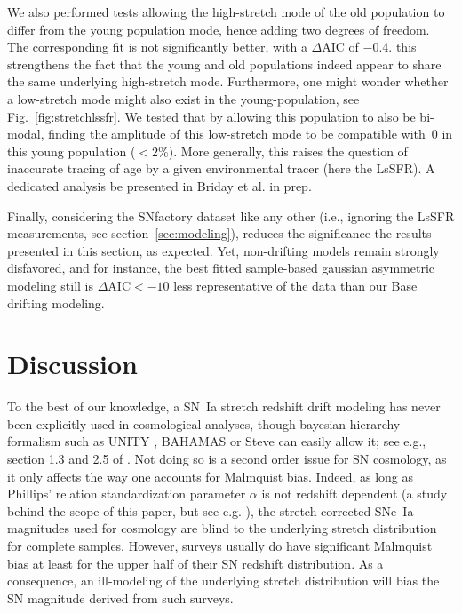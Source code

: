 \documentclass[]{aa} %
\newcommand{\mr}[1]{{\textcolor[rgb]{0.60,0.10,0.6}{#1}}}
\begin{document}
We also performed tests allowing
the high-stretch mode of the old population to differ from the young population mode, hence adding two degrees of freedom. The corresponding fit is not
significantly better, with a $\Delta$AIC of $-0.4$. 
this strengthens the fact
that the young and old populations indeed appear to share the same underlying
high-stretch mode. 
\mr{Furthermore, one might wonder whether a low-stretch mode might also exist in the young-population, see Fig.~\ref{fig:stretchlssfr}. We tested that by allowing this population to also be bi-modal, finding the amplitude of this low-stretch mode to be compatible with~0 in this young population ($<2\%$). More generally, this raises the question of inaccurate tracing of age by a given environmental tracer (here the LsSFR). A dedicated analysis be presented in Briday et al. in prep.}

\mr{Finally, considering the SNfactory dataset like any other
(i.e., ignoring the LsSFR measurements, see section~\ref{sec:modeling}),
reduces the significance the results presented in this section, as expected. Yet, non-drifting models remain strongly disfavored, and for instance, the best fitted sample-based gaussian asymmetric modeling still is $\Delta\mathrm{AIC}<-10$ less representative of the data than our Base drifting modeling.}

\section{Discussion}\label{sec:discussion}

To the best of our knowledge, a SN~Ia stretch redshift drift \mr{modeling} has never been explicitly \mr{used} in cosmological analyses, though bayesian hierarchy
formalism such as UNITY \citep{rubin2015}, BAHAMAS \citep{shariff2016} or Steve
\citep{hinton2019} can easily allow it; see e.g., section 1.3 and 2.5 of \cite{rubin2015}.
Not doing so is a second order issue for
SN cosmology, as it only affects the way one accounts for Malmquist bias. Indeed, as long as Phillips' relation \citep{phillips1993} standardization parameter
$\alpha$ is not redshift dependent (a study behind the scope of
this paper, but see e.g. \citealt{scolnic2018a}), the stretch-corrected SNe~Ia
magnitudes used for cosmology are blind to the underlying stretch distribution for complete samples. 
However, surveys usually do have
significant Malmquist bias at least for the upper half of their SN redshift distribution. As a consequence, an ill-modeling of the underlying stretch distribution will bias the SN magnitude derived from such surveys. 
\end{document}
